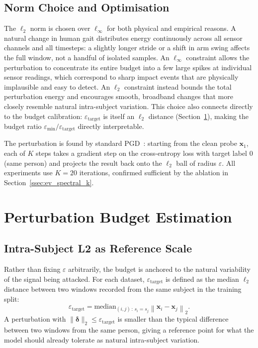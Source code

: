 \subsection{Norm Choice and Optimisation}
\label{ssec:ev_pgd}

The $\ell_2$ norm is chosen over $\ell_\infty$ for both physical and empirical reasons. A natural change in human gait distributes energy continuously across all sensor channels and all timesteps: a slightly longer stride or a shift in arm swing affects the full window, not a handful of isolated samples. An $\ell_\infty$ constraint allows the perturbation to concentrate its entire budget into a few large spikes at individual sensor readings, which correspond to sharp impact events that are physically implausible and easy to detect. An $\ell_2$ constraint instead bounds the total perturbation energy and encourages smooth, broadband changes that more closely resemble natural intra-subject variation. This choice also connects directly to the budget calibration: $\varepsilon_\text{target}$ is itself an $\ell_2$ distance (Section~\ref{sec:ev_budget}), making the budget ratio $\varepsilon_\text{min}/\varepsilon_\text{target}$ directly interpretable.

The perturbation is found by standard PGD~\cite{madry2018towards}: starting from the clean probe $\mathbf{x}_1$, each of $K$ steps takes a gradient step on the cross-entropy loss with target label 0 (same person) and projects the result back onto the $\ell_2$ ball of radius $\varepsilon$. All experiments use $K = 20$ iterations, confirmed sufficient by the ablation in Section~\ref{ssec:ev_spectral_k}.

\section{Perturbation Budget Estimation}
\label{sec:ev_budget}

\subsection{Intra-Subject L2 as Reference Scale}
\label{ssec:ev_l2}

Rather than fixing $\varepsilon$ arbitrarily, the budget is anchored to the natural variability of the signal being attacked. For each dataset, $\varepsilon_\text{target}$ is defined as the median $\ell_2$ distance between two windows recorded from the same subject in the training split:
\begin{equation}
  \varepsilon_\text{target}
  = \mathrm{median}_{(i,j)\,:\,s_i = s_j}
    \left\| \mathbf{x}_i - \mathbf{x}_j \right\|_2.
\end{equation}
A perturbation with $\|\boldsymbol{\delta}\|_2 \leq \varepsilon_\text{target}$ is smaller than the typical difference between two windows from the same person, giving a reference point for what the model should already tolerate as natural intra-subject variation.

